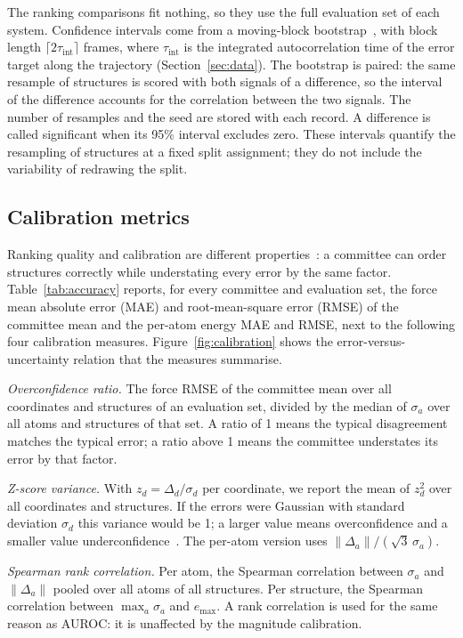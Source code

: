 The ranking comparisons fit nothing, so they use the full evaluation set of
each system. Confidence intervals come from a moving-block
bootstrap~\citep{kunsch1989jackknife}, with block length $\lceil 2\tau_{\mathrm{int}}\rceil$
frames, where $\tau_{\mathrm{int}}$ is the integrated autocorrelation time of
the error target along the trajectory (Section~\ref{sec:data}). The bootstrap
is paired: the same resample of structures is scored with both signals of a
difference, so the interval of the difference accounts for the correlation
between the two signals. The number of resamples and the seed are stored with
each record. A difference is called significant when its 95\% interval excludes
zero. These intervals quantify the resampling of structures at a fixed split
assignment; they do not include the variability of redrawing the split.

\subsection{Calibration metrics}
\label{sec:calibmetrics}

Ranking quality and calibration are different
properties~\citep{pernot2022long,tran2020methods}: a committee can order
structures correctly while understating every error by the same factor.
Table~\ref{tab:accuracy} reports, for every committee and evaluation set, the
force mean absolute error (MAE) and root-mean-square error (RMSE) of the
committee mean and the per-atom energy MAE and RMSE, next to the following four
calibration measures. Figure~\ref{fig:calibration} shows the
error-versus-uncertainty relation that the measures summarise.

\emph{Overconfidence ratio.} The force RMSE of the committee mean over all
coordinates and structures of an evaluation set, divided by the median of
$\sigma_a$ over all atoms and structures of that set. A ratio of 1 means the
typical disagreement matches the typical error; a ratio above 1 means the
committee understates its error by that factor.

\emph{Z-score variance.} With $z_d=\Delta_d/\sigma_d$ per coordinate, we report
the mean of $z_d^2$ over all coordinates and structures. If the errors were
Gaussian with standard deviation $\sigma_d$ this variance would be 1; a larger
value means overconfidence and a smaller value
underconfidence~\citep{kahle2022quality,busk2021calibrated}. The per-atom
version uses $\lVert\Delta_a\rVert/(\sqrt{3}\,\sigma_a)$.

\emph{Spearman rank correlation.} Per atom, the Spearman correlation between
$\sigma_a$ and $\lVert\Delta_a\rVert$ pooled over all atoms of all structures.
Per structure, the Spearman correlation between $\max_a\sigma_a$ and
$e_{\max}$. A rank correlation is used for the same reason as AUROC: it is
unaffected by the magnitude calibration.

